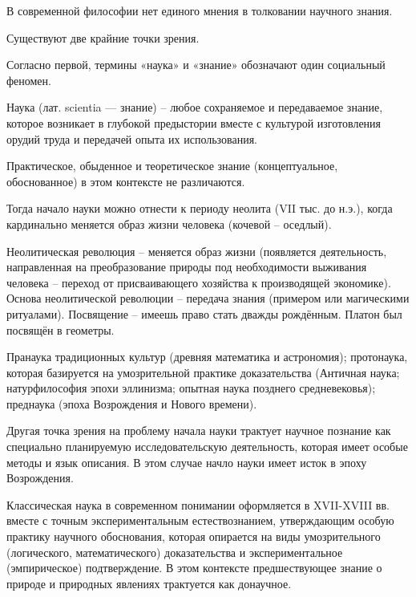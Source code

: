 \documentclass[exam_answers.tex]{subfiles}
\begin{document}
\renewcommand{\baselinestretch}{0.75}

В современной философии нет единого мнения в толковании научного знания.

Существуют две крайние точки зрения.

Согласно первой, термины «наука» и «знание» обозначают один социальный феномен.

Наука (лат. scientia — знание) – любое сохраняемое и передаваемое знание, которое возникает в глубокой предыстории вместе с культурой изготовления орудий труда и передачей опыта их использования.

Практическое, обыденное и теоретическое знание (концептуальное, обоснованное) в этом контексте не различаются.

Тогда начало науки можно отнести к периоду неолита (VII тыс. до н.э.), когда кардинально меняется образ жизни человека (кочевой – оседлый).

Неолитическая революция – меняется образ жизни (появляется деятельность, направленная на преобразование природы под необходимости выживания человека – переход от присваивающего хозяйства к производящей экономике).
Основа неолитической революции – передача знания (примером или магическими ритуалами).
Посвящение – имеешь право стать дважды рождённым.
Платон был посвящён в геометры.

Пранаука традиционных культур (древняя математика и астрономия);
протонаука, которая базируется на умозрительной практике доказательства (Античная наука; натурфилософия эпохи эллинизма;
опытная наука позднего средневековья);
преднаука (эпоха Возрождения и Нового времени).

Другая точка зрения на проблему начала науки трактует научное познание как специально планируемую исследовательскую деятельность, которая имеет особые методы и язык описания.
В этом случае начло науки имеет исток в эпоху Возрождения.

Классическая наука в современном понимании оформляется в XVII-XVIII вв. вместе с точным экспериментальным естествознанием, утверждающим особую практику научного обоснования, которая опирается на виды умозрительного (логического, математического) доказательства и экспериментальное (эмпирическое) подтверждение.
В этом контексте предшествующее знание о природе и природных явлениях трактуется как донаучное.
\end{document}

